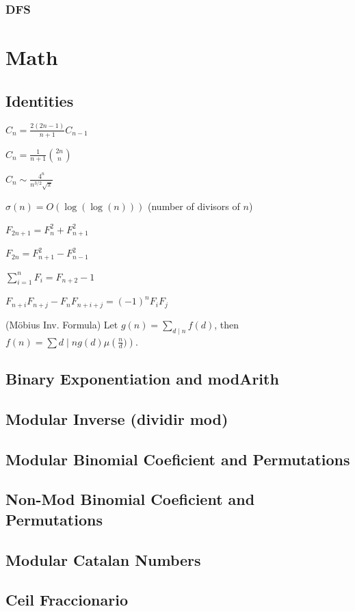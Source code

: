 \subsubsection{DFS}

\section{Math}
\subsection{Identities}
{
$C_n = \frac{2(2n-1)}{n+1} C_{n-1}$

$C_n = \frac{1}{n+1} \binom{2n}{n}$

$C_n \sim \frac{4^n}{n^{3/2}\sqrt{\pi}}$

$\sigma(n) = O(\log(\log(n)))$ (number of divisors of $n$)

$F_{2n+1} = F_{n}^2 + F_{n+1}^2$

$F_{2n} = F_{n+1}^2 - F_{n-1}^2$

$\sum_{i=1}^n F_i = F_{n+2}-1$

$F_{n+i}F_{n+j} - F_nF_{n+i+j} = (-1)^n F_iF_j$

(Möbius Inv. Formula)
Let $g(n) = \sum_{d\mid n} f(d)$, then $f(n)=\sum{d\mid n} g(d) \mu\left(\frac{n}{d})\right)$.
}
\subsection{Binary Exponentiation and modArith}
\subsection{Modular Inverse (dividir mod)}
\subsection{Modular Binomial Coeficient and Permutations}
\subsection{Non-Mod Binomial Coeficient and Permutations}
\subsection{Modular Catalan Numbers}
\subsection{Ceil Fraccionario}
